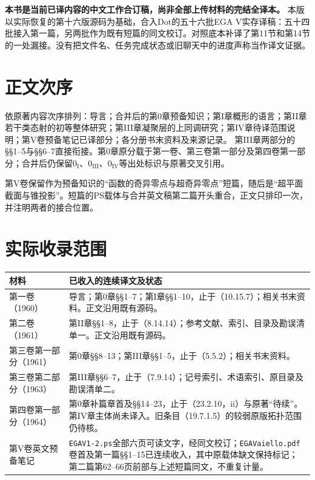 \maketitle
{}
\noindent\textbf{本书是当前已译内容的中文工作合订稿，尚非全部上传材料的完结全译本。}
本版以实际恢复的第十六版源码为基础，合入Dot的五十六批EGA V实存译稿：五十四批接入第一篇，另两批作为既有短篇的同文校订。对照底本补译了第11节和第14节的一处漏接。没有把文件名、任务完成状态或旧聊天中的进度声称当作译文证据。

\section*{正文次序}
依原著内容次序排列：导言；合并后的第0章预备知识；第I章概形的语言；第II章若干类态射的初等整体研究；第III章凝聚层的上同调研究；第IV章待译范围说明；第V卷预备笔记已译部分；各分册书末资料及来源记录。
第III章两部分的§§1--5与§§6--7直接衔接。第0章原分载于第一卷、第三卷第一部分及第四卷第一部分；合并后仍保留$0_{\mathrm I}$、$0_{\mathrm{III}}$、$0_{\mathrm{IV}}$等出处标识与原著交叉引用。

第V卷保留作为预备知识的“函数的奇异零点与超奇异零点”短篇，随后是“超平面截面与锥投影”。短篇的PS载体与合并英文稿第二篇开头重合，正文只排印一次，并注明两者的接合位置。

\section*{实际收录范围}
\begin{longtable}{@{}p{.25\linewidth}p{.67\linewidth}@{}}
\toprule 材料&已收入的连续译文及状态\\\midrule\endhead
第一卷（1960）&导言；第0章§§1--7；第I章§§1--10，止于（10.15.7）；相关书末资料。正文沿用既有源码。\\
第二卷（1961）&第II章§§1--8，止于（8.14.14）；参考文献、索引、目录及勘误清单一。正文沿用既有源码。\\
第三卷第一部分（1961）&第0章§§8--13；第III章§§1--5，止于（5.5.2）；相关书末资料。\\
第三卷第二部分（1963）&第III章§§6--7，止于（7.9.14）；记号索引、术语索引、原目录及勘误清单二。\\
第四卷第一部分（1964）&第0章补篇章首及§§14--23，止于（23.2.10，ii）与原著“待续”。第IV章主体尚未译入。旧条目（19.7.1.5）的较弱原版拓扑范围仍待核。\\
第V卷英文预备笔记&\texttt{EGAV1-2.ps}全部六页可读文字，经同文校订；\texttt{EGAVaiello.pdf}卷首及第一篇§§1--15已连续收入，其中原载体缺文保持标记；第二篇第62--66页前部与上述短篇同文，不重复计量。\\
\bottomrule
\end{longtable}

